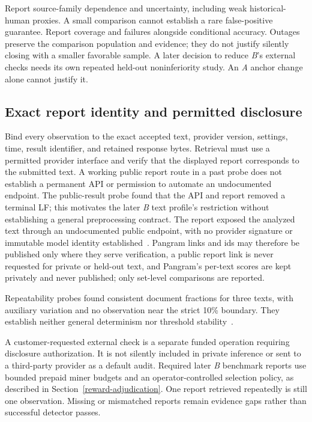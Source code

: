 Report source-family dependence and uncertainty, including weak historical-human
proxies. A small comparison cannot establish a rare false-positive guarantee.
Report coverage and failures alongside conditional accuracy. Outages preserve
the comparison population and evidence; they do not justify silently closing
with a smaller favorable sample. A later decision to reduce \textit{B}'s external
checks needs its own repeated held-out noninferiority study. An \textit{A}
anchor change alone cannot justify it.

\subsection{Exact report identity and permitted disclosure}\label{audit-sequence}

Bind every observation to the exact accepted text, provider version, settings,
time, result identifier, and retained response bytes. Retrieval must use a
permitted provider interface and verify that the displayed report corresponds
to the submitted text. A working public report route in a past probe does not
establish a permanent API or permission to automate an undocumented endpoint.
The public-result probe found that the API and report removed a terminal LF;
this motivates the later \textit{B} text profile's restriction without establishing
a general preprocessing contract. The report exposed the analyzed text through
an undocumented public endpoint, with no provider signature or immutable model
identity established~\cite{reportprobe}. Pangram links and ids may therefore
be published only where they serve verification, a public report link is never
requested for private or held-out text, and Pangram's per-text scores are kept
privately and never published; only set-level comparisons are reported.

Repeatability probes found consistent document fractions for three texts, with
auxiliary variation and no observation near the strict 10\% boundary. They
establish neither general determinism nor threshold stability~\cite{repeatability}.

A customer-requested external check is a separate funded operation requiring
disclosure authorization. It is not silently included in private inference or
sent to a third-party provider as a default audit. Required later \textit{B}
benchmark reports use bounded prepaid miner budgets and an operator-controlled
selection policy, as described in Section~\ref{reward-adjudication}. One report
retrieved repeatedly is still one observation. Missing or mismatched reports
remain evidence gaps rather than successful detector passes.

